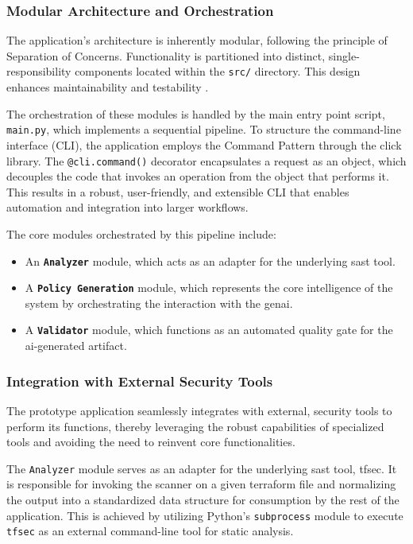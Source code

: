 \subsubsection{Modular Architecture and Orchestration}

The application's architecture is inherently modular, following the principle of Separation of Concerns. Functionality is partitioned into distinct, single-responsibility components located within the \texttt{src/} directory. This design enhances maintainability and testability \cite{martin_clean_2009}.

The \gls{orchestration} of these modules is handled by the main entry point script, \texttt{main.py}, which implements a sequential pipeline. To structure the command-line interface (CLI), the application employs the Command Pattern through the click library. The \texttt{@cli.command()} decorator encapsulates a request as an object, which decouples the code that invokes an operation from the object that performs it. This results in a robust, user-friendly, and extensible CLI that enables automation and integration into larger workflows.

The core modules orchestrated by this pipeline include:

\begin{itemize}
\item An \textbf{\texttt{Analyzer}} module, which acts as an adapter for the underlying \gls{sast} tool.
\item A \textbf{\texttt{Policy Generation}} module, which represents the core intelligence of the system by orchestrating the interaction with the \gls{genai}.
\item A \textbf{\texttt{Validator}} module, which functions as an automated quality gate for the \gls{ai}-generated artifact.
\end{itemize}

\subsubsection{Integration with External Security Tools}
The prototype application seamlessly integrates with external, security tools to perform its functions, thereby leveraging the robust capabilities of specialized tools and avoiding the need to reinvent core functionalities.

The \texttt{Analyzer} module serves as an adapter for the underlying \gls{sast} tool, tfsec. It is responsible for invoking the scanner on a given \gls{terraform} file and normalizing the output into a standardized data structure for consumption by the rest of the application. This is achieved by utilizing Python's \texttt{subprocess} module to execute \texttt{tfsec} as an external command-line tool for static analysis.

